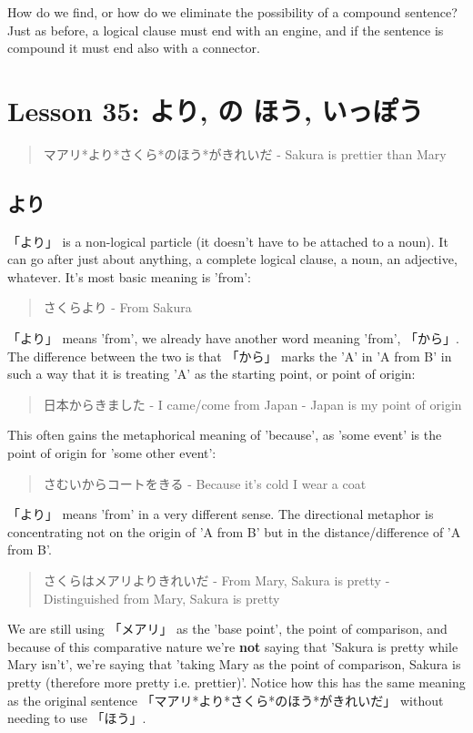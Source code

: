\documentclass[11pt]{article}
\begin{document}
How do we find, or how do we eliminate the possibility of a compound sentence? Just as before, a logical clause must end with an engine, and if the sentence is compound it must end also with a connector.
\section{Lesson 35: より, の ほう, いっぽう}
\label{sec:org3f47943}
\begin{quote}
マアリ*より*さくら*のほう*がきれいだ - Sakura is prettier than Mary
\end{quote}

\subsection{より}
\label{sec:org14e3c78}
「より」 is a non-logical particle (it doesn't have to be attached to a noun). It can go after just about anything, a complete logical clause, a noun, an adjective, whatever. It's most basic meaning is 'from':
\begin{quote}
さくらより - From Sakura
\end{quote}

「より」 means 'from', we already have another word meaning 'from', 「から」. The difference between the two is that 「から」 marks the 'A' in 'A from B' in such a way that it is treating 'A' as the starting point, or point of origin:
\begin{quote}
日本からきました - I came/come from Japan - Japan is my point of origin
\end{quote}
This often gains the metaphorical meaning of 'because', as 'some event' is the point of origin for 'some other event':
\begin{quote}
さむいからコートをきる - Because it's cold I wear a coat
\end{quote}

「より」 means 'from' in a very different sense. The directional metaphor is concentrating not on the origin of 'A from B' but in the distance/difference of 'A from B'.
\begin{quote}
さくらはメアリよりきれいだ - From Mary, Sakura is pretty - Distinguished from Mary, Sakura is pretty
\end{quote}
We are still using 「メアリ」 as the 'base point', the point of comparison, and because of this comparative nature we're \textbf{not} saying that 'Sakura is pretty while Mary isn't', we're saying that 'taking Mary as the point of comparison, Sakura is pretty (therefore more pretty i.e. prettier)'. Notice how this has the same meaning as the original sentence 「マアリ*より*さくら*のほう*がきれいだ」 without needing to use 「ほう」.
\end{document}
